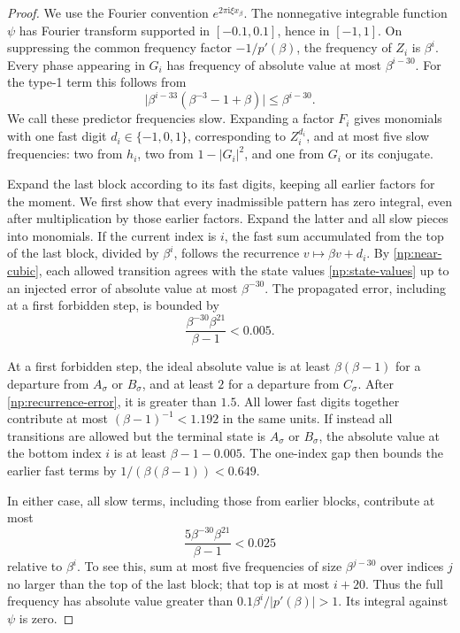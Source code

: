 \begin{proof}
We use the Fourier convention \(e^{2\pi\mathrm i\xi x_\beta}\).
The nonnegative integrable function \(\psi\) has Fourier transform
supported in \([-0.1,0.1]\), hence in \([-1,1]\). On suppressing the
common frequency factor \(-1/p'(\beta)\), the frequency of \(Z_i\) is
\(\beta^i\). Every phase appearing in \(G_i\) has frequency of absolute
value at most \(\beta^{i-30}\). For the type-1 term this follows from
\[
 \bigl|\beta^{i-33}(\beta^{-3}-1+\beta)\bigr|\le\beta^{i-30}.
\]
We call these predictor frequencies slow. Expanding a factor \(F_i\)
gives monomials with one fast digit \(d_i\in\{-1,0,1\}\), corresponding
to \(Z_i^{d_i}\), and at most five slow frequencies: two from \(h_i\),
two from \(1-|G_i|^2\), and one from \(G_i\) or its conjugate.

Expand the last block according to its fast digits, keeping all earlier
factors for the moment. We first show that every inadmissible pattern
has zero integral, even after multiplication by those earlier factors.
Expand the latter and all slow pieces into monomials. If the current
index is \(i\), the fast sum accumulated from the top of the last block,
divided by \(\beta^i\), follows the recurrence
\(v\mapsto\beta v+d_i\). By \eqref{np:near-cubic},
each allowed transition agrees with the state values
\eqref{np:state-values} up to an injected error of absolute value at most
\(\beta^{-30}\). The propagated error, including at a first forbidden
step, is bounded by
\begin{equation}
 \frac{\beta^{-30}\beta^{21}}{\beta-1}<0.005.
 \label{np:recurrence-error}
\end{equation}

At a first forbidden step, the ideal absolute value is at least
\(\beta(\beta-1)\) for a departure from \(A_\sigma\) or \(B_\sigma\),
and at least \(2\) for a departure from \(C_\sigma\). After
\eqref{np:recurrence-error}, it is greater than \(1.5\). All lower fast
digits together contribute at most \((\beta-1)^{-1}<1.192\) in the same
units. If instead all transitions are allowed but the terminal state is
\(A_\sigma\) or \(B_\sigma\), the absolute value at the bottom index
\(i\) is at least \(\beta-1-0.005\). The one-index gap then bounds the
earlier fast terms by \(1/(\beta(\beta-1))<0.649\).

In either case, all slow terms, including those from earlier blocks,
contribute at most
\begin{equation}
 \frac{5\beta^{-30}\beta^{21}}{\beta-1}<0.025
 \label{np:slow-error}
\end{equation}
relative to \(\beta^i\). To see this, sum at most five frequencies of
size \(\beta^{j-30}\) over indices \(j\) no larger than the top of the
last block; that top is at most \(i+20\). Thus the full frequency has
absolute value greater than
\(0.1\beta^i/|p'(\beta)|>1\). Its integral against \(\psi\) is zero.


\end{proof}

